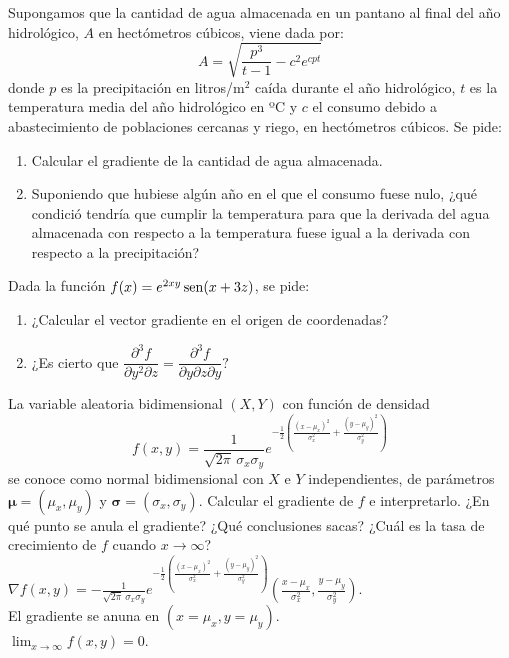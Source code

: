 {Supongamos que la cantidad de agua almacenada en un pantano al final del año hidrológico, $A$ en hectómetros cúbicos, viene dada por:
\[
A = \sqrt {\frac{{p^3 }}{{t - 1}} - c^2 e^{cpt}}
\]
donde $p$ es la precipitación en litros/m$^2$ caí­da durante el año hidrológico, $t$ es la temperatura media del año hidrológico en ºC y $c$ el consumo debido a abastecimiento de poblaciones cercanas y riego, en hectómetros cúbicos.
Se pide:
\begin{enumerate}
\item Calcular el gradiente de la cantidad de agua almacenada.
\item Suponiendo que hubiese algún año en el que el consumo fuese nulo, ¿qué condició tendrí­a que cumplir la temperatura para que la derivada del agua almacenada con respecto a la temperatura fuese igual a la derivada con respecto a la precipitación?
\end{enumerate}
}


{Dada la función $f(x)=e^{2xy}\operatorname{sen}(x+3z)$, se pide:
\begin{enumerate}
  \item ¿Calcular el vector gradiente en el origen de coordenadas?
  \item ¿Es cierto que $\dfrac{\partial^3f}{\partial y^2\partial z}=\dfrac{\partial^3f}{\partial y\partial z\partial y}?$
\end{enumerate}
}


{La variable aleatoria bidimensional $(X,Y)$ con función de densidad
\[
f(x,y) = \frac{1}{\sqrt{2\pi}\, \sigma_x\sigma_y} e^{-\frac{1}{2}\left(\frac{(x-\mu_x)^2}{\sigma_x^2}+\frac{(y-\mu_y)^2}{\sigma_y^2}\right)}
\]
se conoce como normal bidimensional con $X$ e $Y$ independientes, de parámetros $\mathbf{\mu}=(\mu_x,\mu_y)$ y $\mathbf{\sigma}=(\sigma_x,\sigma_y)$.
Calcular el gradiente de $f$ e interpretarlo. ¿En qué punto se anula el gradiente? ¿Qué conclusiones sacas? ¿Cuál es la tasa de crecimiento de $f$ cuando $x\rightarrow \infty$?
}
{$\nabla f(x,y) = -\frac{1}{\sqrt{2\pi}\, \sigma_x\sigma_y} e^{-\frac{1}{2}\left(\frac{(x-\mu_x)^2}{\sigma_x^2}+\frac{(y-\mu_y)^2}{\sigma_y^2}\right)} \left(\frac{x-\mu_x}{\sigma_x^2}, \frac{y-\mu_y}{\sigma_y^2}\right)$.\\
El gradiente se anuna en $(x=\mu_x, y=\mu_y)$.\\
$\lim_{x\rightarrow \infty}f(x,y) = 0$. 
}
{
}


